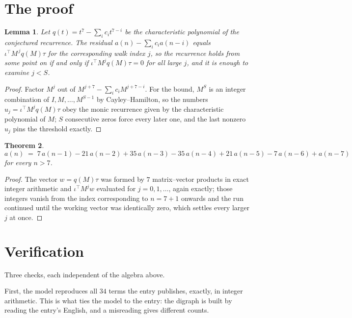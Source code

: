 \documentclass[11pt,a4paper]{article}
\theoremstyle{plain}
\newtheorem{theorem}{Theorem}
\newtheorem{lemma}[theorem]{Lemma}
\theoremstyle{definition}
\begin{document}
\section{The proof}

\begin{lemma}\label{lem:crit}
Let $q(t)=t^{7}-\sum_i c_it^{7-i}$ be the characteristic polynomial of the
conjectured recurrence. The residual $a(n)-\sum_ic_ia(n-i)$ equals
$\iota^{\!\top}M^{\,j}q(M)\tau$ for the corresponding walk index $j$, so the recurrence
holds from some point on if and only if $\iota^{\!\top}M^{j}q(M)\tau=0$ for all large $j$,
and it is enough to examine $j<S$.
\end{lemma}

\begin{proof}
Factor $M^{j}$ out of $M^{j+7}-\sum_ic_iM^{j+7-i}$. For the bound, $M^{S}$
is an integer combination of $I,M,\dots,M^{S-1}$ by Cayley--Hamilton, so the numbers
$u_j=\iota^{\!\top}M^{j}q(M)\tau$ obey the monic recurrence given by the characteristic
polynomial of $M$; $S$ consecutive zeros force every later one, and the last nonzero $u_j$
pins the threshold exactly.
\end{proof}

\begin{theorem}
\[
a(n)\;=\;7\,a(n-1) - 21\,a(n-2) + 35\,a(n-3) - 35\,a(n-4) + 21\,a(n-5) - 7\,a(n-6) + a(n-7)
\]
for every $n>7$.
\end{theorem}

\begin{proof}
The vector $w=q(M)\tau$ was formed by $7$ matrix--vector products in exact integer
arithmetic and $\iota^{\!\top}M^{j}w$ evaluated for $j=0,1,\dots$, again exactly; those
integers vanish from the index corresponding to $n=7+1$ onwards and the run continued
until the working vector was identically zero, which settles every larger $j$ at once.
\end{proof}

\section{Verification}

Three checks, each independent of the algebra above.

First, the model reproduces all $34$ terms the entry publishes, exactly, in integer
arithmetic. This is what ties the model to the entry: the digraph is built by reading the
entry's English, and a misreading gives different counts.
\end{document}
